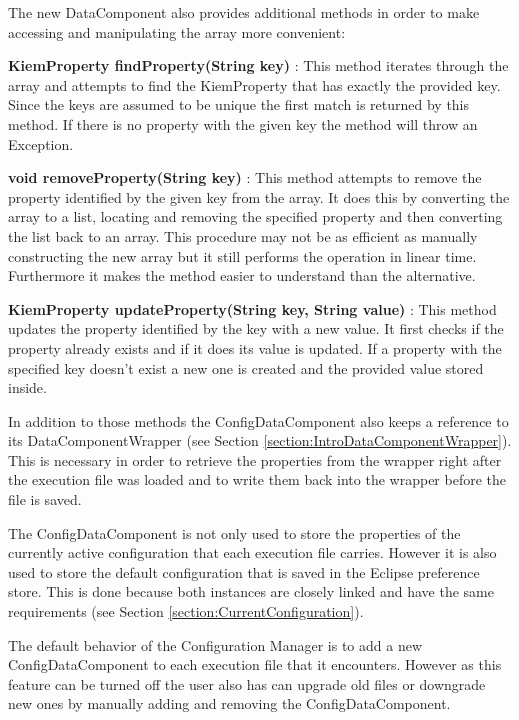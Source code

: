 The new DataComponent also provides additional methods in order to make accessing and manipulating the
array more convenient:
\begin{description}
 \item \textbf{KiemProperty findProperty(String key)} : This method iterates through the array and attempts
to find the KiemProperty that has exactly the provided key. Since the keys are assumed to be unique the first
match is returned by this method. If there is no property with the given key the method will throw
an Exception.
 \item \textbf{void removeProperty(String key)} : This method attempts to remove the property identified by
the given key from the array. It does this by converting the array to a list, locating and removing the
specified property and then converting the list back to an array. This procedure may not be as efficient
as manually constructing the new array but it still performs the operation in linear time. Furthermore
it makes the method easier to understand than the alternative.
 \item \textbf{KiemProperty updateProperty(String key, String value)} : This method updates the property 
identified by the key with a new value. It first checks if the property already exists and if it does its value
is updated. If a property with the specified key doesn't exist a new one is created and the provided value
stored inside.
\end{description}

In addition to those methods the ConfigDataComponent also keeps a reference to its DataComponentWrapper (see Section
\ref{section:IntroDataComponentWrapper}). This is necessary in order to retrieve the properties from the wrapper
right after the execution file was loaded and to write them back into the wrapper before the file is saved.

The ConfigDataComponent is not only used to store the properties of the currently active configuration that each
execution file carries. However it is also used to store the default configuration that is saved in the Eclipse
preference store. This is done because both instances are closely linked and have the same requirements
(see Section \ref{section:CurrentConfiguration}).

The default behavior of the Configuration Manager is to add a new ConfigDataComponent to each execution file
that it encounters. However as this feature can be turned off the user also has can upgrade old files or
downgrade new ones by manually adding and removing the ConfigDataComponent.


